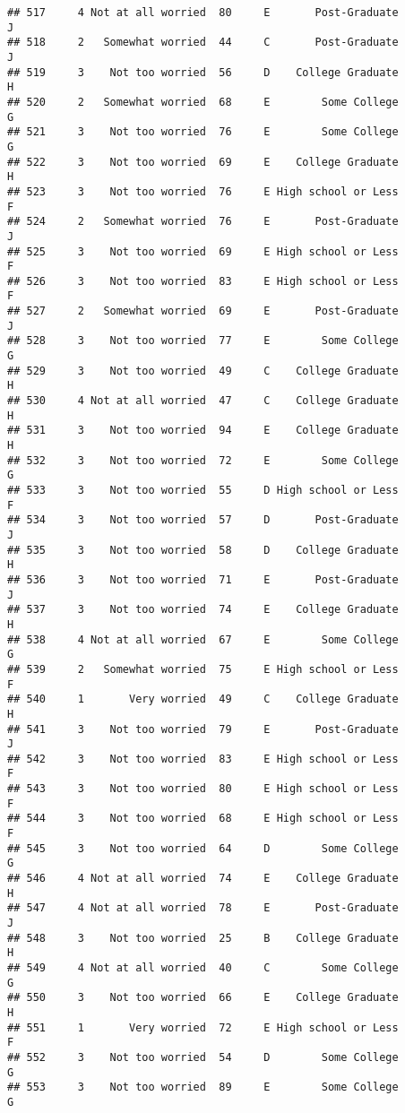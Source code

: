 \documentclass[
]{article}
\begin{document}
\begin{verbatim}
## 517     4 Not at all worried  80     E       Post-Graduate         J
## 518     2   Somewhat worried  44     C       Post-Graduate         J
## 519     3    Not too worried  56     D    College Graduate         H
## 520     2   Somewhat worried  68     E        Some College         G
## 521     3    Not too worried  76     E        Some College         G
## 522     3    Not too worried  69     E    College Graduate         H
## 523     3    Not too worried  76     E High school or Less         F
## 524     2   Somewhat worried  76     E       Post-Graduate         J
## 525     3    Not too worried  69     E High school or Less         F
## 526     3    Not too worried  83     E High school or Less         F
## 527     2   Somewhat worried  69     E       Post-Graduate         J
## 528     3    Not too worried  77     E        Some College         G
## 529     3    Not too worried  49     C    College Graduate         H
## 530     4 Not at all worried  47     C    College Graduate         H
## 531     3    Not too worried  94     E    College Graduate         H
## 532     3    Not too worried  72     E        Some College         G
## 533     3    Not too worried  55     D High school or Less         F
## 534     3    Not too worried  57     D       Post-Graduate         J
## 535     3    Not too worried  58     D    College Graduate         H
## 536     3    Not too worried  71     E       Post-Graduate         J
## 537     3    Not too worried  74     E    College Graduate         H
## 538     4 Not at all worried  67     E        Some College         G
## 539     2   Somewhat worried  75     E High school or Less         F
## 540     1       Very worried  49     C    College Graduate         H
## 541     3    Not too worried  79     E       Post-Graduate         J
## 542     3    Not too worried  83     E High school or Less         F
## 543     3    Not too worried  80     E High school or Less         F
## 544     3    Not too worried  68     E High school or Less         F
## 545     3    Not too worried  64     D        Some College         G
## 546     4 Not at all worried  74     E    College Graduate         H
## 547     4 Not at all worried  78     E       Post-Graduate         J
## 548     3    Not too worried  25     B    College Graduate         H
## 549     4 Not at all worried  40     C        Some College         G
## 550     3    Not too worried  66     E    College Graduate         H
## 551     1       Very worried  72     E High school or Less         F
## 552     3    Not too worried  54     D        Some College         G
## 553     3    Not too worried  89     E        Some College         G

\end{verbatim}
\end{document}
